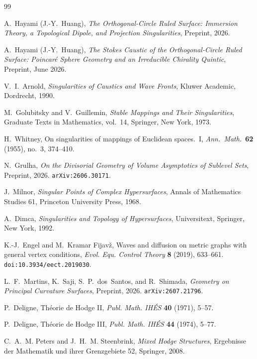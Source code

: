 \documentclass[11pt]{article}
\begin{document}
\begin{thebibliography}{99}

A.~Hayami (J.-Y.~Huang),
\textit{The Orthogonal-Circle Ruled Surface: Immersion Theory, a Topological
Dipole, and Projection Singularities},
Preprint, 2026.

A.~Hayami (J.-Y.~Huang),
\textit{The Stokes Caustic of the Orthogonal-Circle Ruled Surface:
Poincar\'e Sphere Geometry and an Irreducible Chirality Quintic},
Preprint, June 2026.

V.~I.~Arnold,
\textit{Singularities of Caustics and Wave Fronts},
Kluwer Academic, Dordrecht, 1990.

M.~Golubitsky and V.~Guillemin,
\textit{Stable Mappings and Their Singularities},
Graduate Texts in Mathematics, vol.~14, Springer, New York, 1973.

H.~Whitney,
On singularities of mappings of Euclidean spaces.\ I,
\textit{Ann.\ Math.}\ \textbf{62} (1955), no.\ 3, 374--410.

N.~Grulha,
\textit{On the Divisorial Geometry of Volume Asymptotics of Sublevel Sets},
Preprint, 2026.  \texttt{arXiv:2606.30171}.

J.~Milnor,
\textit{Singular Points of Complex Hypersurfaces},
Annals of Mathematics Studies 61, Princeton University Press, 1968.

A.~Dimca,
\textit{Singularities and Topology of Hypersurfaces},
Universitext, Springer, New York, 1992.

K.-J.~Engel and M.~Kramar Fijav\v{z},
Waves and diffusion on metric graphs with general vertex conditions,
\textit{Evol. Equ. Control Theory} \textbf{8} (2019), 633--661.
\texttt{doi:10.3934/eect.2019030}.

L.~F.~Martins, K.~Saji, S.~P.~dos~Santos, and R.~Shimada,
\textit{Geometry on Principal Curvature Surfaces},
Preprint, 2026.  \texttt{arXiv:2607.21796}.

P.~Deligne,
Th\'{e}orie de Hodge II,
\textit{Publ. Math. IH\'{E}S} \textbf{40} (1971), 5--57.

P.~Deligne,
Th\'{e}orie de Hodge III,
\textit{Publ. Math. IH\'{E}S} \textbf{44} (1974), 5--77.

C.~A.~M. Peters and J.~H.~M. Steenbrink,
\textit{Mixed Hodge Structures},
Ergebnisse der Mathematik und ihrer Grenzgebiete 52, Springer, 2008.


\end{thebibliography}
\end{document}
